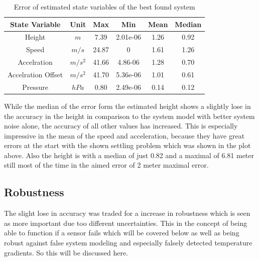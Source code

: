 \begin{table}[h!]
\centering
\begin{tabular}{cccccc}
\hline
\multicolumn{1}{|c|}{State Variable} & \multicolumn{1}{c|}{Unit} & \multicolumn{1}{c|}{Max} & \multicolumn{1}{c|}{Min} & \multicolumn{1}{c|}{Mean} & \multicolumn{1}{c|}{Median} \\ \hline
Height                            & $m$                         & 7.39	                  & 2.01e-06                 & 1.26                    & 0.92                      \\
Speed                             & $m/s$                       & 24.87                   & 0                        & 1.61                    & 1.26                      \\
Accelration                       & $m/s^2$   			& 41.66                   & 4.86-06                  & 1.28                    & 0.70                     \\
Accelration Offset                & $m/s^2$   			& 41.70                   & 5.36e-06                 & 1.01                    & 0.61                     \\
Pressure		          & $hPa$   			& 0.80                    & 2.49e-06                 & 0.14                    & 0.12 
\end{tabular}
\caption{Error of estimated state variables of the best found system}
\label{tab:ErrorBestPerformanceSystem}
\end{table}

While the median of the error form the estimated height shows a slightly lose in the accuracy in the height in comparison to the system model with better system noise alone,
the accuracy of all other values has increased.
This is especially impressive in the mean of the speed and acceleration, because they have great errors at the start with the shown settling problem which was shown in the plot above. 
Also the height is with a median of just 0.82 and a maximal of 6.81 meter still most of the time in the aimed error of 2 meter maximal error.

\subsection{Robustness}
The slight lose in accuracy was traded for a increase in robustness which is seen as more important due too different uncertainties.
This in the concept of being able to function if a sensor fails which will be covered below as well as being robust against false system modeling 
and especially falsely detected temperature gradients. So this will be discussed here.

